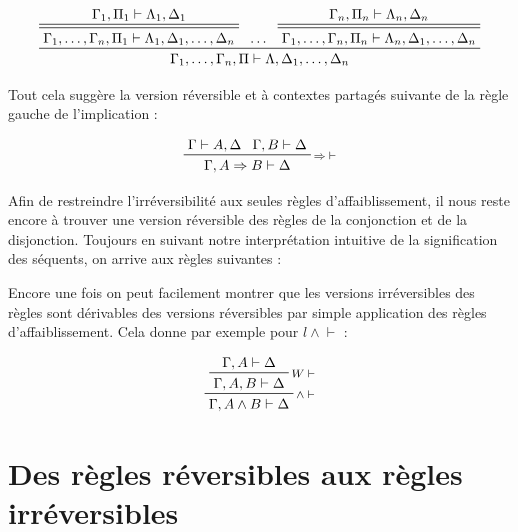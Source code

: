 \documentclass[11pt]{report}
\newcommand{\lto}{\Rightarrow}
\newcommand{\seq}{\vdash}
\newcommand{\irule}[1]{\footnotesize$#1$}
\newcommand{\iruleL}[1]{\irule{{#1}\seq}}
\newcommand{\iruleR}[1]{\irule{\seq{#1}}}
\begin{document}
\begin{displaymath}
    \prftree
        {\prftree[d]
            {\Gamma_1,\Pi_1 \seq \Lambda_1,\Delta_1}
            {\Gamma_1,\ldots,\Gamma_n,\Pi_1 \seq \Lambda_1,\Delta_1,\ldots,\Delta_n}}
        {\ldots}
        {\prftree[d]
            {\Gamma_n,\Pi_n \seq \Lambda_n,\Delta_n}
            {\Gamma_1,\ldots,\Gamma_n,\Pi_n \seq \Lambda_n,\Delta_1,\ldots,\Delta_n}}
        {\Gamma_1,\ldots,\Gamma_n,\Pi \seq \Lambda,\Delta_1,\ldots,\Delta_n}
\end{displaymath}

Tout cela suggère la version réversible et à contextes partagés suivante de la règle gauche de l'implication :

\begin{displaymath}
    \prftree[r]{\iruleL{\lto}}
        {\Gamma \seq A,\Delta}
        {\Gamma,B \seq \Delta}
        {\Gamma,A \lto B \seq \Delta}
\end{displaymath}

Afin de restreindre l'irréversibilité aux seules règles d'affaiblissement, il nous reste encore à trouver une version réversible des règles de la conjonction et de la disjonction. Toujours en suivant notre interprétation intuitive de la signification des séquents, on arrive aux règles suivantes :


Encore une fois on peut facilement montrer que les versions irréversibles des règles sont dérivables des versions réversibles par simple application des règles d'affaiblissement. Cela donne par exemple pour {\iruleL{l\land}} :

\begin{displaymath}
    \prftree[r]{\iruleL{\land}}
        {\prftree[r]{\iruleL{W}}
            {\Gamma,A \seq \Delta}
            {\Gamma,A,B \seq \Delta}}
        {\Gamma,A \land B \seq \Delta}
\end{displaymath}

\section{Des règles réversibles aux règles irréversibles}
\end{document}
